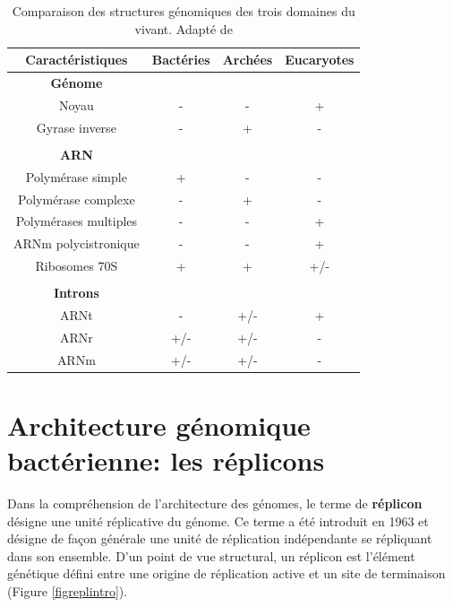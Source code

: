 \begin{table}[H]\label{tabdomaincomp}
\begin{center}
\caption[Comparaison des structures génomiques des trois domaines du vivant]{Comparaison des structures génomiques des trois domaines du vivant. Adapté de \citep{perry1997microbiology} }\label{tabdomaincomp}
\begin{tabular}{cccc}
	\textbf{Caractéristiques} & Bactéries & Archées & Eucaryotes\\
	\hline
	\textbf{Génome} & & & \\
	Noyau & - & - & + \\
	Gyrase inverse & - & + & - \\
	\\
	\textbf{ARN} & & & \\
	Polymérase simple & + & - & - \\
	Polymérase complexe & - & + & - \\
	Polymérases multiples & - & - & + \\
	ARNm polycistronique & - & - & + \\
	Ribosomes 70S & + & + & +/- \\
	\\
	\textbf{Introns} & & & \\
	ARNt & - & +/- & + \\
	ARNr & +/- & +/- & - \\
	ARNm & +/- & +/- & - \\
\end{tabular} 
\end{center}
\end{table} 
 
 
 \section{Architecture génomique bactérienne: les réplicons}\label{architecture}
	Dans la compréhension de l'architecture des génomes, le terme de \textbf{réplicon} désigne une unité réplicative du génome. Ce terme a été introduit en 1963 \citep{jacob1963regulation} et désigne de façon générale une unité de réplication indépendante se répliquant dans son ensemble. D'un point de vue structural, un réplicon est l'élément génétique défini entre une origine de réplication active et un site de terminaison (Figure \ref{figreplintro}). 

